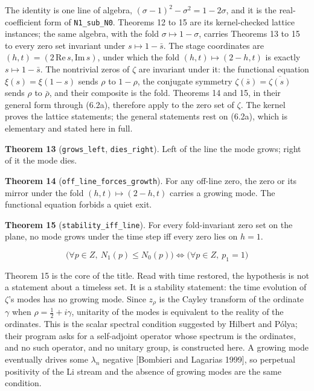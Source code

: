 \documentclass[10pt]{article}
\begin{document}
The identity is one line of algebra,
\((\sigma - 1)^2 - \sigma^2 = 1 - 2\sigma\), and it is the
real-coefficient form of \texttt{N1\_sub\_N0}. Theorems 12 to 15 are its
kernel-checked lattice instances; the same algebra, with the fold
\(\sigma \mapsto 1 - \sigma\), carries Theorems 13 to 15 to every zero
set invariant under \(s \mapsto 1 - \bar s\). The stage coordinates are
\((h, t) = (2\,\mathrm{Re}\, s, \mathrm{Im}\, s)\), under which the fold
\((h, t) \mapsto (2 - h, t)\) is exactly \(s \mapsto 1 - \bar s\). The
nontrivial zeros of \(\zeta\) are invariant under it: the functional
equation \(\xi(s) = \xi(1 - s)\) sends \(\rho\) to \(1 - \rho\), the
conjugate symmetry \(\zeta(\bar s) = \overline{\zeta(s)}\) sends
\(\rho\) to \(\bar\rho\), and their composite is the fold. Theorems 14
and 15, in their general form through (6.2a), therefore apply to the
zero set of \(\zeta\). The kernel proves the lattice statements; the
general statements rest on (6.2a), which is elementary and stated here
in full.

\textbf{Theorem 13} (\texttt{grows\_left}, \texttt{dies\_right}). Left
of the line the mode grows; right of it the mode dies.

\textbf{Theorem 14} (\texttt{off\_line\_forces\_growth}). For any
off-line zero, the zero or its mirror under the fold
\((h, t) \mapsto (2 - h, t)\) carries a growing mode. The functional
equation forbids a quiet exit.

\textbf{Theorem 15} (\texttt{stability\_iff\_line}). For every
fold-invariant zero set on the plane, no mode grows under the time step
iff every zero lies on \(h = 1\).

\[\Big(\forall p \in Z,\ N_1(p) \leq N_0(p)\Big) \iff \Big(\forall p \in Z,\ p_1 = 1\Big)\]

Theorem 15 is the core of the title. Read with time restored, the
hypothesis is not a statement about a timeless set. It is a stability
statement: the time evolution of \(\zeta\)'s modes has no growing mode.
Since \(z_\rho\) is the Cayley transform of the ordinate \(\gamma\) when
\(\rho = \tfrac12 + i\gamma\), unitarity of the modes is equivalent to
the reality of the ordinates. This is the scalar spectral condition
suggested by Hilbert and Pólya; their program asks for a self-adjoint
operator whose spectrum is the ordinates, and no such operator, and no
unitary group, is constructed here. A growing mode eventually drives
some \(\lambda_n\) negative {[}Bombieri and Lagarias 1999{]}, so
perpetual positivity of the Li stream and the absence of growing modes
are the same condition.
\end{document}
